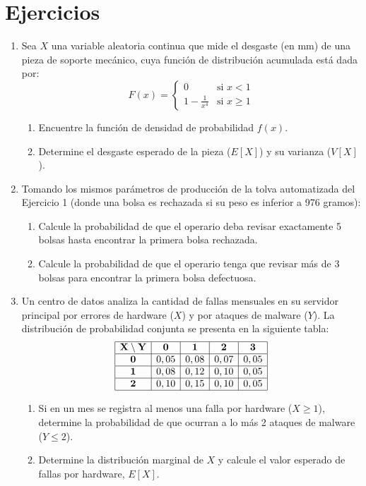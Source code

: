 \documentclass[letterpaper,12pt]{article}
\newenvironment{ejercicios}{%
    \section*{Ejercicios}
}{}
\begin{document}
\begin{ejercicios}
\begin{enumerate}[leftmargin=*,itemsep=0.8em]
    \item Sea $X$ una variable aleatoria continua que mide el desgaste (en mm) de una pieza de soporte mecánico, cuya función de distribución acumulada está dada por:
    $$F(x) = \begin{cases} 0 & \text{si } x < 1 \\ 1 - \frac{1}{x^4} & \text{si } x \geq 1 \end{cases}$$
    \begin{enumerate}[label=\alph*)]
        \item Encuentre la función de densidad de probabilidad $f(x)$.
        \item Determine el desgaste esperado de la pieza ($E[X]$) y su varianza ($V[X]$).
    \end{enumerate}

    \item Tomando los mismos parámetros de producción de la tolva automatizada del Ejercicio 1 (donde una bolsa es rechazada si su peso es inferior a 976 gramos):
    \begin{enumerate}[label=\alph*)]
        \item Calcule la probabilidad de que el operario deba revisar exactamente 5 bolsas hasta encontrar la primera bolsa rechazada.
        \item Calcule la probabilidad de que el operario tenga que revisar más de 3 bolsas para encontrar la primera bolsa defectuosa.
    \end{enumerate}

    \item Un centro de datos analiza la cantidad de fallas mensuales en su servidor principal por errores de hardware ($X$) y por ataques de malware ($Y$). La distribución de probabilidad conjunta se presenta en la siguiente tabla:
    $$\begin{array}{|c|c|c|c|c|}
    \hline
    \mathbf{X} \setminus \mathbf{Y} & \mathbf{0} & \mathbf{1} & \mathbf{2} & \mathbf{3} \\ \hline
    \mathbf{0} & 0,05 & 0,08 & 0,07 & 0,05 \\ \hline
    \mathbf{1} & 0,08 & 0,12 & 0,10 & 0,05 \\ \hline
    \mathbf{2} & 0,10 & 0,15 & 0,10 & 0,05 \\ \hline
    \end{array}$$
    \begin{enumerate}[label=\alph*)]
        \item Si en un mes se registra al menos una falla por hardware ($X \geq 1$), determine la probabilidad de que ocurran a lo más 2 ataques de malware ($Y \leq 2$).
        \item Determine la distribución marginal de $X$ y calcule el valor esperado de fallas por hardware, $E[X]$.
    \end{enumerate}


\end{enumerate}
\end{ejercicios}
\end{document}
